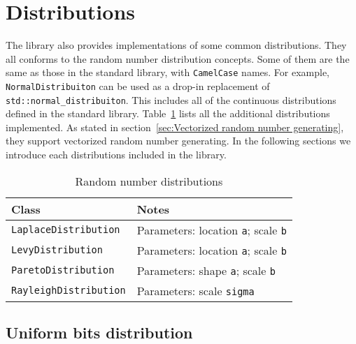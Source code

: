 \section{Distributions}
\label{sec:Distributions}

The library also provides implementations of some common distributions. They
all conforms to the \cppoo random number distribution concepts. Some of them
are the same as those in the \cppoo standard library, with \verb|CamelCase|
names. For example, \verb|NormalDistribuiton| can be used as a drop-in
replacement of \verb|std::normal_distribuiton|. This includes all of the
continuous distributions defined in the standard library.
Table~\ref{tab:Random number distributions} lists all the additional
distributions implemented. As stated in section~\ref{sec:Vectorized random
  number generating}, they support vectorized random number generating. In the
following sections we introduce each distributions included in the library.

\begin{table}
  \begin{tabularx}{\textwidth}{lX}
    \toprule
    Class & Notes \\
    \midrule
    \verb|LaplaceDistribution|
    & Parameters: location \verb|a|; scale \verb|b| \\
    \verb|LevyDistribution|
    & Parameters: location \verb|a|; scale \verb|b| \\
    \verb|ParetoDistribution|
    & Parameters: shape \verb|a|; scale \verb|b| \\
    \verb|RayleighDistribution|
    & Parameters: scale \verb|sigma| \\
    \bottomrule
  \end{tabularx}
  \caption{Random number distributions}
  \label{tab:Random number distributions}
\end{table}

\subsection{Uniform bits distribution}
\label{sub:Uniform bits distribution}

